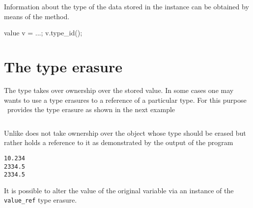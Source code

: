 Information about the type of the data stored in the  instance 
can be obtained by means of the  method. 
\begin{cppcode}
value v = ...;
v.type_id();
\end{cppcode}


\section{The  type erasure}

The  type takes over ownership over the stored value. 
In some cases one may wants to use a type erasures to a reference of a
particular type.  For this purpose \libpnicore\ provides the 
type erasure as shown in the next example

\inputminted[fontsize=\small,
             linenos,
             firstnumber=26,
             firstline=26,
             lastline=45,
             frame=lines,
             label=examples/type\_erasure2.cpp]
{cpp}{../examples/type_erasure2.cpp}
Unlike   does not take ownership over the object
whose type should be erased but rather holds a reference to it
as demonstrated by the output of the program
\begin{verbatim}
10.234
2334.5
2334.5
\end{verbatim}
It is possible to alter the value of the original variable via an instance of
the \texttt{value\_ref} type erasure.

